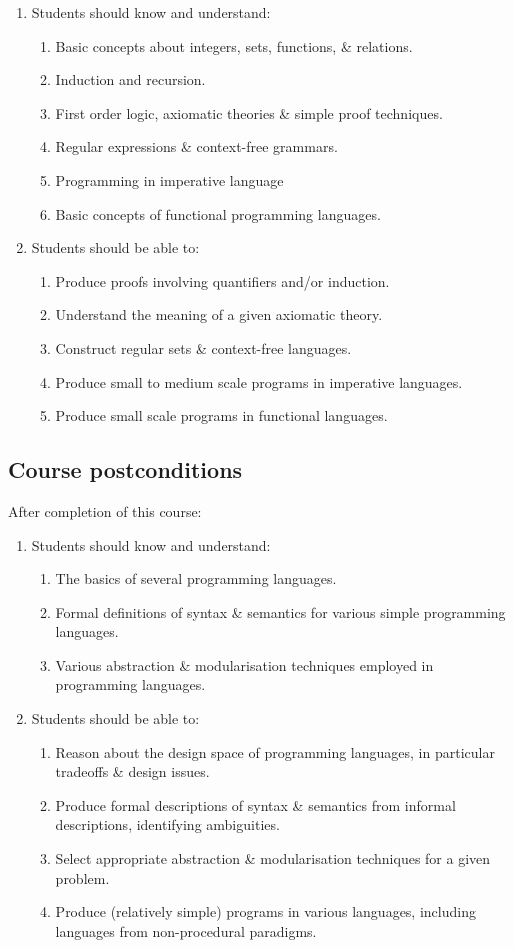 \documentclass[11pt]{article}
\theoremstyle{definition}
\begin{document}
\begin{enumerate}
\item Students should know and understand:
\begin{enumerate}
\item Basic concepts about integers, sets, functions, \& relations.
\item Induction and recursion.
\item First order logic, axiomatic theories \& simple proof techniques.
\item Regular expressions \& context-free grammars.
\item Programming in imperative language
\item Basic concepts of functional programming languages.
\end{enumerate}
\item Students should be able to:
\begin{enumerate}
\item Produce proofs involving quantifiers and/or induction.
\item Understand the meaning of a given axiomatic theory.
\item Construct regular sets \& context-free languages.
\item Produce small to medium scale programs in imperative languages.
\item Produce small scale programs in functional languages.
\end{enumerate}
\end{enumerate}

\subsection{Course postconditions}
\label{sec:org67e1e33}
After completion of this course:

\begin{enumerate}
\item Students should know and understand:
\begin{enumerate}
\item The basics of several programming languages.
\item Formal definitions of syntax \& semantics for various
simple programming languages.
\item Various abstraction \& modularisation techniques
employed in programming languages.
\end{enumerate}
\item Students should be able to:
\begin{enumerate}
\item Reason about the design space of programming languages,
in particular tradeoffs \& design issues.
\item Produce formal descriptions of syntax \& semantics
from informal descriptions, identifying ambiguities.
\item Select appropriate abstraction \& modularisation techniques
for a given problem.
\item Produce (relatively simple) programs in various languages,
including languages from non-procedural paradigms.
\end{enumerate}
\end{enumerate}
\end{document}

